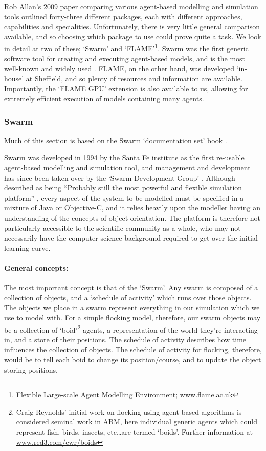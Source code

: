 \documentclass[11pt,a4paper]{article}
\begin{document}
Rob Allan's 2009 paper comparing various agent-based modelling and simulation tools \cite{robABM} outlined forty-three different packages, each with different approaches, capabilities and specialities. Unfortunately, there is very little general comparison available, and so choosing which package to use could prove quite a task. We look in detail at two of these; `Swarm' and `FLAME'\footnote{Flexible Large-scale Agent Modelling Environment; \url{www.flame.ac.uk}}. Swarm was the first generic software tool for creating and executing agent-based models, and is the most well-known and widely used \cite{robABM}. FLAME, on the other hand, was developed `in-house' at Sheffield, and so plenty of resources and information are available. Importantly, the `FLAME GPU' extension is also available to us, allowing for extremely efficient execution of models containing many agents.

\subsubsection{Swarm}
Much of this section is based on the Swarm `documentation set' book \cite{swarmDoc}.

Swarm was developed in 1994 by the Santa Fe institute as the first re-usable agent-based modelling and simulation tool, and management and development has since been taken over by the `Swarm Development Group' \cite{robABM}. Although described as being ``Probably still the most powerful and flexible simulation platform'' \cite{robABM}, every aspect of the system to be modelled must be specified in a mixture of Java or Objective-C, and it relies heavily upon the modeller having an understanding of the concepts of object-orientation. The platform is therefore not particularly accessible to the scientific community as a whole, who may not necessarily have the computer science background required to get over the initial learning-curve.

\paragraph{General concepts:}
The most important concept is that of the `Swarm'. Any swarm is composed of a collection of objects, and a `schedule of activity' which runs over those objects. The objects we place in a swarm represent everything in our simulation which we use to model with. For a simple flocking model, therefore, our swarm objects may be a collection of `boid'\footnote{Craig Reynolds' initial work on flocking using agent-based algorithms is considered seminal work in ABM, here individual generic agents which could represent fish, birds, insects, etc\ldots are termed `boids'. Further information at \url{www.red3.com/cwr/boids}} agents, a representation of the world they're interacting in, and a store of their positions. The schedule of activity describes how time influences the collection of objects. The schedule of activity for flocking, therefore, would be to tell each boid to change its position/course, and to update the object storing positions. 
\end{document}
